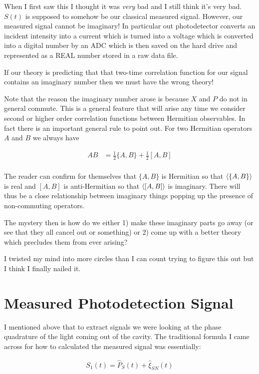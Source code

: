 \documentclass[12pt]{article}
\begin{document}
When I first saw this I thought it was \textit{very} bad and I still think it's very bad. $S(t)$ is supposed to somehow be our classical measured signal. However, our measured signal cannot be imaginary! In particular out photodetector converts an incident intensity into a current which is turned into a voltage which is converted into a digital number by an ADC which is then saved on the hard drive and represented as a REAL number stored in a raw data file.

If our theory is predicting that that two-time correlation function for our signal contains an imaginary number then we must have the wrong theory!

Note that the reason the imaginary number arose is because $X$ and $P$ do not in general commute. This is a general feature that will arise any time we consider second or higher order correlation functions between Hermitian observables. In fact there is an important general rule to point out. For two Hermitian operators $A$ and $B$ we always have

\begin{align}
AB &= \frac{1}{2}\{A,B\} + \frac{1}{2}[A,B]\\
\end{align}

The reader can confirm for themselves that $\{A,B\}$ is Hermitian so that $\Braket{\{A,B\}}$ is real and $[A,B]$ is anti-Hermitian so that $\Braket{[A,B]}$ is imaginary. There will thus be a close relationship between imaginary things popping up the presence of non-commuting operators.

The mystery then is how do we either 1) make these imaginary parts go away (or see that they all cancel out or something) or 2) come up with a better theory which precludes them from ever arising?

I twisted my mind into more circles than I can count trying to figure this out but I think I finally nailed it.

\section{Measured Photodetection Signal}

I mentioned above that to extract signals we were looking at the phase quadrature of the light coming out of the cavity. The traditional formula I came across for how to calculated the measured signal was essentially:

\begin{align}
S_1(t) = \hat{P}_S(t) + \hat{\xi}_{SN}(t)
\end{align}
\end{document}
